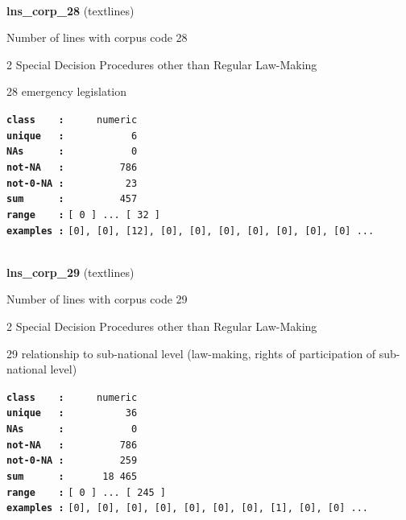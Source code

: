 \documentclass[]{article}
\begin{document}
~

\textbf{lns\_corp\_28} (textlines)

Number of lines with corpus code 28

2 Special Decision Procedures other than Regular Law-Making

28 emergency legislation

\textbf{\texttt{class\ \ \ \ :}} \texttt{~~~~~numeric}\\
\textbf{\texttt{unique\ \ \ :}} \texttt{~~~~~~~~~~~6}\\
\textbf{\texttt{NAs\ \ \ \ \ \ :}} \texttt{~~~~~~~~~~~0}\\
\textbf{\texttt{not-NA\ \ \ :}} \texttt{~~~~~~~~~786}\\
\textbf{\texttt{not-0-NA\ :}} \texttt{~~~~~~~~~~23}\\
\textbf{\texttt{sum\ \ \ \ \ \ :}} \texttt{~~~~~~~~~457}\\
\textbf{\texttt{range\ \ \ \ :}}
\texttt{{[}\ 0\ {]}\ ...\ {[}\ 32\ {]}}\\
\textbf{\texttt{examples\ :}}
\texttt{{[}0{]},\ {[}0{]},\ {[}12{]},\ {[}0{]},\ {[}0{]},\ {[}0{]},\ {[}0{]},\ {[}0{]},\ {[}0{]},\ {[}0{]}\ ...}\\

~

\textbf{lns\_corp\_29} (textlines)

Number of lines with corpus code 29

2 Special Decision Procedures other than Regular Law-Making

29 relationship to sub-national level (law-making, rights of
participation of sub-national level)

\textbf{\texttt{class\ \ \ \ :}} \texttt{~~~~~numeric}\\
\textbf{\texttt{unique\ \ \ :}} \texttt{~~~~~~~~~~36}\\
\textbf{\texttt{NAs\ \ \ \ \ \ :}} \texttt{~~~~~~~~~~~0}\\
\textbf{\texttt{not-NA\ \ \ :}} \texttt{~~~~~~~~~786}\\
\textbf{\texttt{not-0-NA\ :}} \texttt{~~~~~~~~~259}\\
\textbf{\texttt{sum\ \ \ \ \ \ :}} \texttt{~~~~~~18~465}\\
\textbf{\texttt{range\ \ \ \ :}}
\texttt{{[}\ 0\ {]}\ ...\ {[}\ 245\ {]}}\\
\textbf{\texttt{examples\ :}}
\texttt{{[}0{]},\ {[}0{]},\ {[}0{]},\ {[}0{]},\ {[}0{]},\ {[}0{]},\ {[}0{]},\ {[}1{]},\ {[}0{]},\ {[}0{]}\ ...}\\
\end{document}
